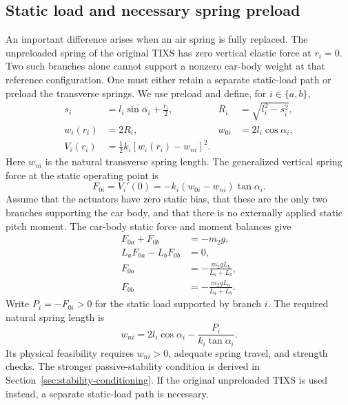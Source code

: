 \documentclass[a4paper,12pt]{article}
\numberwithin{equation}{section}
\begin{document}
\subsection{Static load and necessary spring preload}
An important difference arises when an air spring is fully replaced. The unpreloaded spring of the original TIXS has zero vertical elastic force at $r_i=0$. Two such branches alone cannot support a nonzero car-body weight at that reference configuration. One must either retain a separate static-load path or preload the transverse springs. We use preload and define, for $i\in\{a,b\}$,
\begin{equation}
\begin{aligned}
s_i&=l_i\sin\alpha_i+\frac{r_i}{2},&
R_i&=\sqrt{l_i^2-s_i^2},\\
w_i(r_i)&=2R_i,&
w_{0i}&=2l_i\cos\alpha_i,\\
V_i(r_i)&=\frac12k_i[w_i(r_i)-w_{ni}]^2.
\end{aligned}
\label{eq:preload-energy}
\end{equation}
Here $w_{ni}$ is the natural transverse spring length. The generalized vertical spring force at the static operating point is
\begin{equation}
 F_{0i}=V_i'(0)=-k_i(w_{0i}-w_{ni})\tan\alpha_i.
 \label{eq:static-force}
\end{equation}
Assume that the actuators have zero static bias, that these are the only two branches supporting the car body, and that there is no externally applied static pitch moment. The car-body static force and moment balances give
\begin{equation}
\begin{aligned}
F_{0a}+F_{0b}&=-m_2g,\\
L_aF_{0a}-L_bF_{0b}&=0,\\
F_{0a}&=-\frac{m_2gL_b}{L_a+L_b},\\
F_{0b}&=-\frac{m_2gL_a}{L_a+L_b}.
\end{aligned}
\label{eq:static-equilibrium}
\end{equation}
Write $P_i=-F_{0i}>0$ for the static load supported by branch $i$. The required natural spring length is
\begin{equation}
w_{ni}=2l_i\cos\alpha_i-\frac{P_i}{k_i\tan\alpha_i}.
\label{eq:required-natural-length}
\end{equation}
Its physical feasibility requires $w_{ni}>0$, adequate spring travel, and strength checks. The stronger passive-stability condition is derived in Section~\ref{sec:stability-conditioning}. If the original unpreloaded TIXS is used instead, a separate static-load path is necessary.
\end{document}
